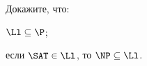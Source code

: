 Докажите, что:
\begin{enumcyr}
    \item $\Ll \subseteq \P$;
    \item если $\SAT \in \Ll$, то $\NP \subseteq \Ll$.
\end{enumcyr}
